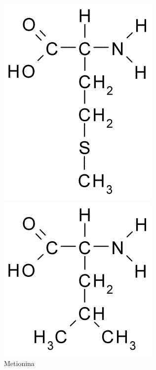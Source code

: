 \begin{figure}[H]
	\begin{center}
		\begin{minipage}{0.3\linewidth}
			\centering   
			\includegraphics[width=0.63\linewidth]{secProteins/figures/methionine.png}	
			\caption{Metionina}
			\label{fig:methionine}
		\end{minipage}
		\begin{minipage}{0.3\linewidth}
			\centering   
			\includegraphics[width=0.8\linewidth]{secProteins/figures/leucine.png}

\end{minipage}
\end{center}
\end{figure}
